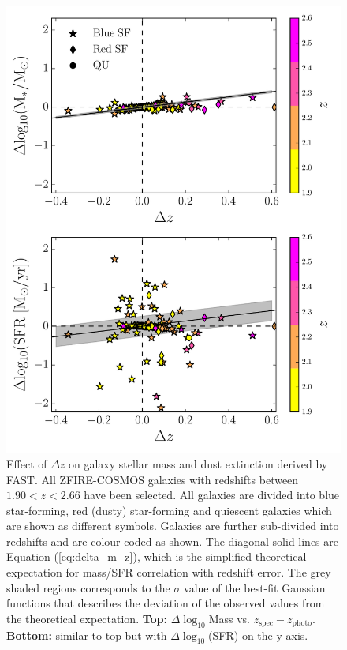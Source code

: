 \documentclass[iop]{emulateapj}
\begin{document}
\begin{figure}
\includegraphics[trim = 10 10 10 10, clip, scale=0.58]{figures/delta_mass_lsfr_vs_delta_z.pdf}
\caption{ Effect of $\Delta z$ on galaxy stellar mass and dust extinction derived by FAST.
All ZFIRE-COSMOS galaxies with redshifts between $1.90<z<2.66$ have been selected. All galaxies are divided into blue star-forming, red (dusty) star-forming and quiescent galaxies which are shown as different symbols. Galaxies are further sub-divided into redshifts and are colour coded as shown. 
The diagonal solid lines are Equation (\ref{eq:delta_m_z}), which is the simplified theoretical expectation for mass/SFR  correlation with redshift error.
The grey shaded regions corresponds to the $\sigma$ value of the best-fit Gaussian functions that describes the deviation of the observed values from the theoretical expectation.
{\bf Top:} $\Delta\log_{10}$Mass vs. $z_\mathrm{spec}-z_\mathrm{photo}$. 
{\bf Bottom:} similar to top but with $\Delta\log_{10}$(SFR) on the y axis. 
}
\label{fig:delta_param_vs_delta_z}
\end{figure}
\end{document}

